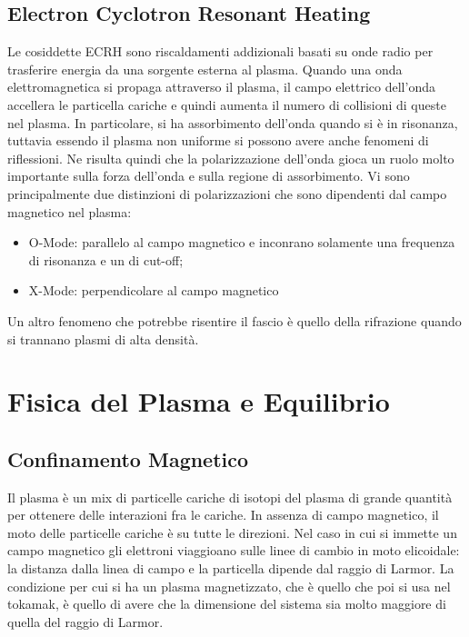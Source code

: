 \documentclass{article}
\begin{document}
\subsection{Electron Cyclotron Resonant Heating}
Le cosiddette ECRH sono riscaldamenti addizionali basati su onde radio per trasferire energia da una sorgente esterna al plasma. Quando una onda elettromagnetica si propaga attraverso il plasma, il campo elettrico dell'onda accellera le particella cariche e quindi aumenta il numero di collisioni di queste nel plasma.\newline
In particolare, si ha assorbimento dell'onda quando si è in risonanza, tuttavia essendo il plasma non uniforme si possono avere anche fenomeni di riflessioni. Ne risulta quindi che la polarizzazione dell'onda gioca un ruolo molto importante sulla forza dell'onda e sulla regione di assorbimento. Vi sono principalmente due distinzioni di polarizzazioni che sono dipendenti dal campo magnetico nel plasma:\begin{itemize}
    \item O-Mode: parallelo al campo magnetico e inconrano solamente una frequenza di risonanza e un di cut-off;
    \item X-Mode: perpendicolare al campo magnetico
\end{itemize}
Un altro fenomeno che potrebbe risentire il fascio è quello della rifrazione quando si trannano plasmi di alta densità.
\section{Fisica del Plasma e Equilibrio}
\subsection{Confinamento Magnetico}
Il plasma è un mix di particelle cariche di isotopi del plasma di grande quantità per ottenere delle interazioni fra le cariche. In assenza di campo magnetico, il moto delle particelle cariche è su tutte le direzioni. Nel caso in cui si immette un campo magnetico gli elettroni viaggioano sulle linee di cambio in moto elicoidale: la distanza dalla linea di campo e la particella dipende dal raggio di Larmor. La condizione per cui si ha un plasma magnetizzato, che è quello che poi si usa nel tokamak, è quello di avere che la dimensione del sistema sia molto maggiore di quella del raggio di Larmor.
\end{document}
